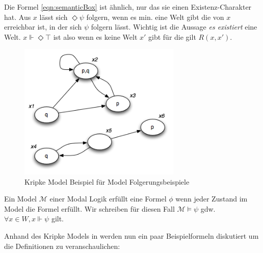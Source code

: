 Die Formel \eqref{eqn:semanticBox} ist ähnlich, nur das sie einen Existenz-Charakter hat. 
Aus $x$ lässt sich $\Diamond \psi$ folgern, wenn es min. eine Welt gibt die von $x$ erreichbar ist, in der sich $\psi$ folgern lässt. 
Wichtig ist die Aussage \emph{es existiert} eine Welt. 
$x \Vdash \Diamond \top$ ist also \false wenn es keine Welt $x'$ gibt für die gilt $R(x,x')$.\\


\begin{figure}
	\centering
	\includegraphics[height=6.5cm]{Images/Kripke01.png}
	\caption{Kripke Model Beispiel für Model Folgerungsbeispiele}
	\label{fig:Kripke01}
\end{figure}


\begin{definition}
	\label{def:model_erfuellt}
	Ein Model $\mathcal{M}$ einer Modal Logik erfüllt eine Formel $\phi$ wenn jeder Zustand im Model die Formel erfüllt.
	Wir schreiben für diesen Fall $\mathcal{M} \vDash \psi$ gdw. $\forall x \in W, x \Vdash \psi$ gilt. \cite[S.310f]{huth2004logic}\\
\end{definition}
%
%
Anhand des Kripke Models in  werden nun ein paar Beispielformeln diskutiert um die Definitionen zu veranschaulichen:

